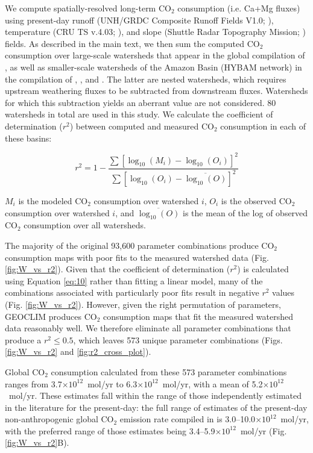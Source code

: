 \documentclass[11pt,letterpaper]{article}
\newcommand{\COtwo}{CO$_{2}$\xspace}
\begin{document}
We compute spatially-resolved long-term \COtwo consumption (i.e. Ca+Mg fluxes) using present-day runoff (UNH/GRDC Composite Runoff Fields V1.0; \citealp{Fekete1999a}), temperature (CRU TS v.4.03; \citealp{Harris2013a}), and slope (Shuttle Radar Topography Mission; \citealp{Farr2007a}) fields. As described in the main text, we then sum the computed \COtwo consumption over large-scale watersheds that appear in the global compilation of \citet{Gaillardet1999a}, as well as smaller-scale watersheds of the Amazon Basin (HYBAM network) in the compilation of \citet{Moquet2011a}, \citet{Moquet2016a}, and \citet{Moquet2018a}. The latter are nested watersheds, which requires upstream weathering fluxes to be subtracted from downstream fluxes. Watersheds for which this subtraction yields an aberrant value are not considered. 80 watersheds in total are used in this study. We calculate the coefficient of determination ($r^{2}$) between computed and measured \COtwo consumption in each of these basins:

\begin{equation}
    r^{2} = 1 - \frac{\sum\left[ \log_{10}(M_{i}) - \log_{10}(O_{i}) \right]^{2}}{\sum\left[ \log_{10}(O_{i}) - \overline{\log_{10}(O)} \right]^{2}}
    \label{eq:10}
\end{equation}

\noindent
$M_{i}$ is the modeled \COtwo consumption over watershed $i$, $O_{i}$ is the observed \COtwo consumption over watershed $i$, and $\overline{\log_{10}(O)}$ is the mean of the log of observed \COtwo consumption over all watersheds.

The majority of the original 93,600 parameter combinations produce \COtwo consumption maps with poor fits to the measured watershed data (Fig. \ref{fig:W_vs_r2}). Given that the coefficient of determination ($r^{2}$) is calculated using Equation \ref{eq:10} rather than fitting a linear model, many of the combinations associated with particularly poor fits result in negative $r^{2}$ values (Fig. \ref{fig:W_vs_r2}). However, given the right permutation of parameters, GEOCLIM produces \COtwo consumption maps that fit the measured watershed data reasonably well. We therefore eliminate all parameter combinations that produce a $r^{2}\leq0.5$, which leaves 573 unique parameter combinations (Figs. \ref{fig:W_vs_r2} and \ref{fig:r2_cross_plot}).

Global CO$_{2}$ consumption calculated from these 573 parameter combinations ranges from 3.7$\times10^{12}$~mol/yr to 6.3$\times10^{12}$~mol/yr, with a mean of 5.2$\times10^{12}$~mol/yr. These estimates fall within the range of those independently estimated in the literature for the present-day: the full range of estimates of the present-day non-anthropogenic global CO$_{2}$ emission rate compiled in \citet{Gerlach2011a} is 3.0--10.0$\times10^{12}$~mol/yr, with the preferred range of those estimates being 3.4--5.9$\times10^{12}$~mol/yr (Fig. \ref{fig:W_vs_r2}B).
\end{document}
